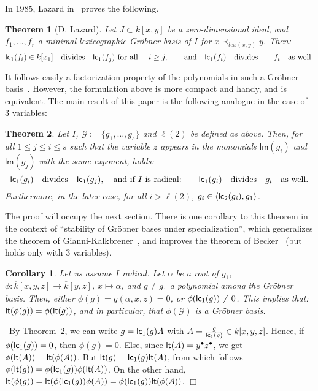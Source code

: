 \documentclass[a4paper,11pt]{article}
\newcommand{\conj}[1]{\ensuremath{{\overline{#1}}}}
\newcommand{\proof}{\noindent {\sc Proof:}~}
\newcommand{\foorp}{\hfill $\Box$}
\def\G{\ensuremath{\mathcal{G}}}
\def\lm{\ensuremath{{\mathsf{lm}}}}
\def\lt{\ensuremath{{\sf lt}}}
\def\lc{\ensuremath{{\sf lc}}}
\def\l{\ensuremath{\langle}}
\def\r{\ensuremath{\rangle}}
\newtheorem{Theo}{Theorem}
\newtheorem{Cor}{Corollary}
\begin{document}
In 1985, Lazard in~\cite{Laz85}  proves the following.
\begin{Theo}[D. Lazard]
Let $J\subset k[x,y]$ be a zero-dimensional ideal,
and $f_1,\ldots,f_r$ a minimal lexicographic Gr\"obner basis
of $I$ for $x\prec_{lex(x,y)} y$. Then:
$$
\lc_1(f_i)\in k[x_1]  \quad \text{divides} \quad \lc_1(f_j) \text{ for all }
\quad i \ge j, \qquad \text{and} \quad \lc_1(f_i)\quad \text{divides}
\quad \quad f_i \quad \text{as well.}
$$
\end{Theo}
It follows easily a factorization property of the polynomials
in such a Gr\"obner basis~\cite[Theorem~1~(i)]{Laz85}.
However, the formulation above
is more compact and handy, and is equivalent.
The main result of this paper is the following analogue
in the case of 3 variables:
\begin{Theo}\label{th:main}
Let $I$, $\G:=\{g_1,\ldots,g_s\}$ and  $\ell(2)$ be defined as above.
Then, for all $1\le j \le i\le s$ such that the variable $z$
appears in the monomials $\lm(g_i)$ and $\lm(g_j)$ with the {\em same
exponent}, holds:
$$\lc_1(g_i) \quad \text{divides} \quad \lc_1(g_j),\quad
\text{and if $I$ is radical:}\qquad \lc_1(g_i)\quad \text{divides}\quad
g_i \quad \text{as well}.$$
Furthermore, in the later case, for all $i >\ell(2)$, $g_i\in \l \lc_2(g_i) ,
g_1\r$.  
\end{Theo}
The proof will occupy the next section.
There is one corollary to this theorem
in the context of ``stability of Gr\"obner bases under specialization'',
which generalizes the theorem of Gianni-Kalkbrener~\cite{Gi87,Ka87},
and improves the theorem of Becker~\cite{Be94}
(but  holds only with 3 variables).
\begin{Cor}\label{cor:main}
Let us assume $I$  radical.
Let $\alpha$ be a root of $g_1$,
$\phi:\conj{k}[x,y,z]\rightarrow\conj{k}[y,z]$, $x\mapsto \alpha$,
and $g\not=g_1$ a polynomial
among the Gr\"obner basis.
Then, either $\phi(g)=g(\alpha,x,z)=0$, or $\phi(\lc_1(g))\not=0$.
This implies that: $\lt(\phi(g))=\phi(\lt(g))$,
and in particular, that $\phi(\G)$ is a Gr\"obner basis.
\end{Cor}
\proof By Theorem~\ref{th:main},
we can write $g= \lc_1(g) A$ with $A=\frac g{\lc_1(g)}\in k[x,y,z]$.
Hence, if $\phi(\lc_1(g))=0$, then $\phi(g)=0$.
Else, since $\lt(A)=y^\bullet z^\bullet$, we get
$\phi(\lt(A))=\lt(\phi(A))$. But $\lt(g) = \lc_1(g) \lt(A)$,
from which follows $\phi ( \lt(g) ) =  \phi(\lc_1(g))
\phi(\lt (A))$.
On the other hand, $\lt(\phi(g))=\lt (\phi(\lc_1(g)) \phi(A))=\phi(\lc_1(g)) \lt(\phi(A))$.
\foorp
\medskip
\end{document}
